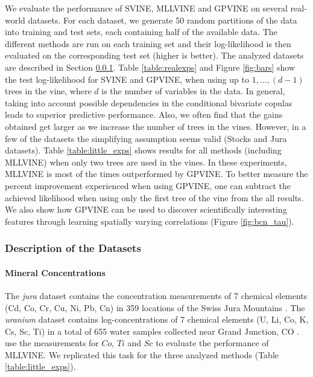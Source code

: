 \documentclass{article}
\begin{document}
We evaluate the performance of SVINE, MLLVINE and GPVINE on several real-world
datasets. For each dataset, we generate 50 random partitions of the data into
training and test sets, each containing half of the available data.  The
different methods are run on each training set and their log-likelihood is then
evaluated on the corresponding test set (higher is better). The analyzed
datasets are described in Section \ref{sec:datasets}.  Table \ref{table:realexps} and Figure
\ref{fig:bars} show the test log-likelihood for SVINE and GPVINE, when using up
to $1,\ldots,(d-1)$ trees in the vine, where $d$ is the number of variables in
the data.  In general, taking into account possible dependencies in the
conditional bivariate copulas leads to superior predictive performance.  Also,
we often find that the gains obtained get larger as we increase the number of
trees in the vines.  However, in a few of the datasets the simplifying
assumption seems valid (Stocks and Jura datasets).  Table
\ref{table:little_exps} shows results for all methods (including MLLVINE) when
only two trees are used in the vines. In these experiments, MLLVINE is most of
the times outperformed by GPVINE. To better measure the percent 
improvement experienced when using GPVINE, one can subtract the achieved
likelihood when using only the first tree of the vine from the all results. We
also show how GPVINE can be used to discover scientifically interesting
features through learning spatially varying correlations (Figure
\ref{fig:bcn_tau}).

\subsubsection{Description of the Datasets}\label{sec:datasets}

\paragraph{Mineral Concentrations}
The \emph{jura} dataset contains the concentration measurements of 7 chemical
elements (Cd, Co, Cr, Cu, Ni, Pb, Cn) in 359 locations of the Swiss Jura
Mountains \citep{jura}. The \emph{uranium} dataset contains log-concentrations
of 7 chemical elements (U, Li, Co, K, Cs, Sc, Ti) in a total of 655 water
samples collected near Grand Junction, CO \citep{uranium}.  \citet{Acar2012}
use the measurements for $Co$, $Ti$ and $Sc$ to evaluate the performance of
MLLVINE. We replicated this task for the three analyzed methods (Table
\ref{table:little_exps}).
\end{document}
